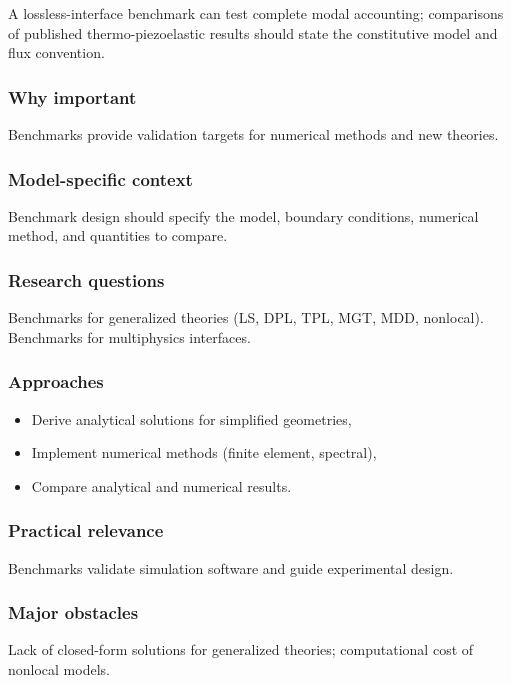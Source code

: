 A lossless-interface benchmark can test complete modal accounting; comparisons of published thermo-piezoelastic results should state the constitutive model and flux convention.

\subsubsection{Why important}

Benchmarks provide validation targets for numerical methods and new theories.

\subsubsection{Model-specific context}

Benchmark design should specify the model, boundary conditions, numerical method, and quantities to compare.

\subsubsection{Research questions}

Benchmarks for generalized theories (LS, DPL, TPL, MGT, MDD, nonlocal). Benchmarks for multiphysics interfaces.

\subsubsection{Approaches}

\begin{itemize}
\item Derive analytical solutions for simplified geometries,
\item Implement numerical methods (finite element, spectral),
\item Compare analytical and numerical results.
\end{itemize}

\subsubsection{Practical relevance}

Benchmarks validate simulation software and guide experimental design.

\subsubsection{Major obstacles}

Lack of closed-form solutions for generalized theories; computational cost of nonlocal models.

